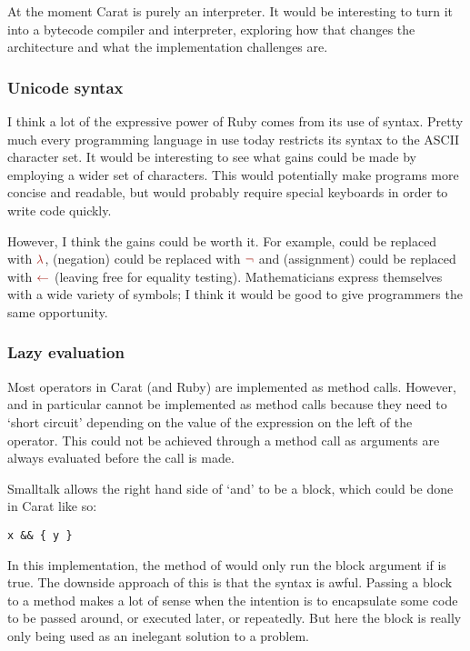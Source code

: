 At the moment Carat is purely an interpreter. It would be interesting to turn it into a bytecode compiler and interpreter, exploring how that changes the architecture and what the implementation challenges are.

\subsubsection{Unicode syntax}

I think a lot of the expressive power of Ruby comes from its use of syntax. Pretty much every programming language in use today restricts its syntax to the ASCII character set. It would be interesting to see what gains could be made by employing a wider set of characters. This would potentially make programs more concise and readable, but would probably require special keyboards in order to write code quickly.

However, I think the gains could be worth it. For example,  could be replaced with $\color{Mahogany} \lambda$, \code{!} (negation) could be replaced with $\color{Mahogany} \neg$ and \code{=} (assignment) could be replaced with $\color{Mahogany} \leftarrow$ (leaving \code{=} free for equality testing). Mathematicians express themselves with a wide variety of symbols; I think it would be good to give programmers the same opportunity.

\subsubsection{Lazy evaluation}

Most operators in Carat (and Ruby) are implemented as method calls. However, \code{&&} and \code{||} in particular cannot be implemented as method calls because they need to `short circuit' depending on the value of the expression on the left of the operator. This could not be achieved through a method call as arguments are always evaluated before the call is made.

Smalltalk allows the right hand side of `and' to be a block, which could be done in Carat like so:

\begin{lstlisting}
x && { y }
\end{lstlisting}

In this implementation, the \code{&&} method of  would only run the block argument if  is true. The downside approach of this is that the syntax is awful. Passing a block to a method makes a lot of sense when the intention is to encapsulate some code to be passed around, or executed later, or repeatedly. But here the block is really only being used as an inelegant solution to a problem.

